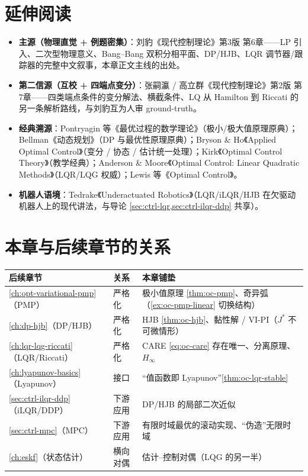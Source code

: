 \section*{延伸阅读}
\begin{itemize}
  \item \textbf{主源（物理直觉 + 例题密集）}：刘豹《现代控制理论》第3版\cite{liubao2006modern} 第6章——LP 引入、二次型物理意义、Bang--Bang 双积分相平面、DP/HJB、LQR 调节器/跟踪器的完整中文叙事，本章正文主线的出处。
  \item \textbf{第二信源（互校 + 四端点变分）}：张嗣瀛 / 高立群《现代控制理论》第2版\cite{zhang2017modern} 第7章——四类端点条件的变分解法、横截条件、LQ 从 Hamilton 到 Riccati 的另一条解析路线，与刘豹互为人审 ground-truth。
  \item \textbf{经典溯源}：Pontryagin 等《最优过程的数学理论》\cite{pontryagin1962mathematical}（极小/极大值原理原典）；Bellman《动态规划》\cite{bellman1957dynamic}（DP 与最优性原理原典）；Bryson \& Ho《Applied Optimal Control》\cite{bryson1975applied}（变分 / 协态 / 估计统一处理）；Kirk《Optimal Control Theory》\cite{kirk2004optimal}（教学经典）；Anderson \& Moore《Optimal Control: Linear Quadratic Methods》\cite{anderson2007optimal}（LQR/LQG 权威）；Lewis 等《Optimal Control》\cite{lewis2012optimal}。
  \item \textbf{机器人语境}：Tedrake《Underactuated Robotics》\cite{tedrake_underactuated}（LQR/iLQR/HJB 在欠驱动机器人上的现代讲法，与导论 \cref{sec:ctrl-lqr,sec:ctrl-ilqr-ddp} 共享）。
\end{itemize}

\section*{本章与后续章节的关系}
\begin{table}[H]\centering\small
\begin{tabular}{lll}
\toprule
后续章节 & 关系 & 本章铺垫 \\
\midrule
\cref{ch:opt-variational-pmp}（PMP）& 严格化 & 极小值原理 \cref{thm:oc-pmp}、奇异弧（\cref{ex:oc-pmp-linear} 切换结构） \\
\cref{ch:dp-hjb}（DP/HJB）& 严格化 & HJB \cref{thm:oc-hjb}、黏性解 / VI-PI（$J^*$ 不可微情形） \\
\cref{ch:lqr-lqg-riccati}（LQR/Riccati）& 严格化 & CARE \cref{eq:oc-care} 存在唯一、分离原理、$H_\infty$ \\
\cref{ch:lyapunov-basics}（Lyapunov）& 接口 & “值函数即 Lyapunov”\cref{thm:oc-lqr-stable} \\
\cref{sec:ctrl-ilqr-ddp}（iLQR/DDP）& 下游应用 & DP/HJB 的局部二次近似 \\
\cref{sec:ctrl-mpc}（MPC）& 下游应用 & 有限时域最优的滚动实现、“伪造”无限时域 \\
\cref{ch:eskf}（状态估计）& 横向对偶 & 估计--控制对偶（LQG 的另一半） \\
\bottomrule
\end{tabular}
\end{table}

